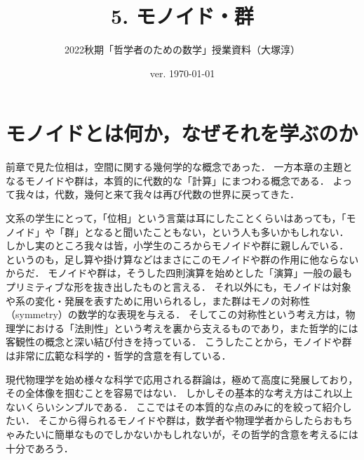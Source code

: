 \documentclass[11pt,a4paper]{jsarticle}
\begin{document}
\title{5. モノイド・群}
\author{2022秋期「哲学者のための数学」授業資料（大塚淳）}
\date{ver. \today}
\maketitle

\section{モノイドとは何か，なぜそれを学ぶのか}
前章で見た位相は，空間に関する幾何学的な概念であった．
一方本章の主題となるモノイドや群は，本質的に代数的な「計算」にまつわる概念である．
よって我々は，代数，幾何と来て我々は再び代数の世界に戻ってきた．

文系の学生にとって，「位相」という言葉は耳にしたことくらいはあっても，「モノイド」や「群」となると聞いたこともない，という人も多いかもしれない．
しかし実のところ我々は皆，小学生のころからモノイドや群に親しんでいる．
というのも，足し算や掛け算などはまさにこのモノイドや群の作用に他ならないからだ．
モノイドや群は，そうした四則演算を始めとした「演算」一般の最もプリミティブな形を抜き出したものと言える．
それ以外にも，モノイドは対象や系の変化・発展を表すために用いられるし，また群はモノの対称性（symmetry）の数学的な表現を与える．
そしてこの対称性という考え方は，物理学における「法則性」という考えを裏から支えるものであり，また哲学的には客観性の概念と深い結び付きを持っている．
こうしたことから，モノイドや群は非常に広範な科学的・哲学的含意を有している．

現代物理学を始め様々な科学で応用される群論は，極めて高度に発展しており，その全体像を掴むことを容易ではない．
しかしその基本的な考え方はこれ以上ないくらいシンプルである．
ここではその本質的な点のみに的を絞って紹介したい．
そこから得られるモノイドや群は，数学者や物理学者からしたらおもちゃみたいに簡単なものでしかないかもしれないが，その哲学的含意を考えるには十分であろう．
\end{document}
